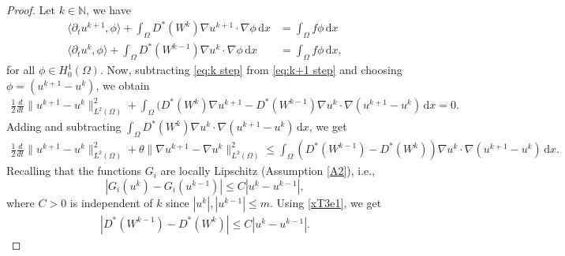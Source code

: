 \documentclass[11pt]{article}
\newcommand{\di}[1]{\,\mathrm{d}#1}
\begin{document}
\begin{proof}
   Let $k\in\mathbb{N}$, we have
    \begin{align}
       \langle \partial_t u^{k+1}, \phi \rangle+\int_{\Omega} D^*(W^{k}) \nabla u^{k+1} \cdot\nabla \phi \di{x} &=  \int_{\Omega} f \phi \di{x}\label{eq:k+1 step}\\
       \langle \partial_t u^{k}, \phi \rangle+\int_{\Omega} D^*(W^{k-1}) \nabla u^{k} \cdot\nabla \phi \di{x} &=  \int_{\Omega} f \phi \di{x}\label{eq:k step},
\end{align}
for all $\phi\in H_0^1(\Omega)$.
Now, subtracting \eqref{eq:k step} from \eqref{eq:k+1 step} and choosing $\phi=(u^{k+1}-u^{k})$, we obtain
\begin{align}
    \frac{1}{2}\frac{d}{dt} \|u^{k+1}-u^{k}\|_{L^2(\Omega)}^2+ \int_{\Omega} (D^*(W^{k}) \nabla u^{k+1}-D^*(W^{k-1}) \nabla u^{k}\cdot\nabla (u^{k+1}-u^{k}) \di{x}=0.
\end{align}
Adding and subtracting $\int_{\Omega} D^*(W^{k}) \nabla u^{k}\cdot\nabla (u^{k+1}-u^{k}) \di{x}$, we get
\begin{align}
    \frac{1}{2}\frac{d}{dt} \|u^{k+1}-u^{k}\|_{L^2(\Omega)}^2+\theta \|\nabla u^{k+1}-\nabla u^{k}\|_{L^2(\Omega)}^2 \leq \int_{\Omega} (D^*(W^{k-1}) -D^*(W^{k}) )\nabla u^{k}\cdot \nabla (u^{k+1}-u^{k}) \di{x}.
\end{align}
 Recalling that the functions $G_i$ are locally Lipschitz (Assumption \ref{A2}), i.e.,
    \begin{equation}
         |G_i(u^{k})-G_i(u^{k-1})|\leq C |u^{k}-u^{k-1}|,\label{xT3e1}
    \end{equation}
    where $C>0$ is independent of $k$ since $|u^k|, |u^{k-1}|\leq m$. Using \eqref{xT3e1}, we get
    \begin{align}
    |D^*(W^{k-1}) -D^*(W^{k})|\leq C|u^k-u^{k-1}|.
\end{align}


\end{proof}
\end{document}
